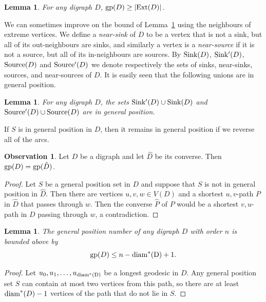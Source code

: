 \documentclass[a4paper,12pt]{article}
\newtheorem{lemma}[theorem]{Lemma}
\theoremstyle{definition}
\newtheorem{observation}[theorem]{Observation}
\newcommand{\sink }{{\rm Sink}}
\newcommand{\nsink }{{\rm Sink'}}
\newcommand{\source }{{\rm Source}}
\newcommand{\nsource }{{\rm Source'}}
\newcommand{\gp}{{\rm gp}}
\newcommand{\diam}{{\rm diam}}
\newcommand{\diamm}{\rm diam ^*}
\newcommand{\ext}{{\rm Ext}}
\begin{document}
	\begin{lemma}\label{lem:ext}
		For any digraph $D$, $\gp (D) \geq |\ext (D)|$.
	\end{lemma}
	
	We can sometimes improve on the bound of Lemma~\ref{lem:ext} using the neighbours of extreme vertices. We define a \emph{near-sink} of $D$ to be a vertex that is not a sink, but all of its out-neighbours are sinks, and similarly a vertex is a \emph{near-source} if it is not a source, but all of its in-neighbours are sources. By $\sink (D)$, $\nsink (D)$, $\source (D)$ and $\nsource (D)$ we denote respectively the sets of sinks, near-sinks, sources, and near-sources of $D$. It is easily seen that the following unions are in general position.
	
	\begin{lemma}\label{lem:sourcesandsinks}
		For any digraph $D$, the sets $\nsink (D) \cup \sink (D)$ and $\nsource (D) \cup \source (D)$ are in general position.
	\end{lemma}
	
	If $S$ is in general position in $D$, then it remains in general position if we reverse all of the arcs.
	
	\begin{observation}\label{obs 1}
		Let $D$ be a digraph and let $\hat{D}$ be its converse. Then $\gp(D) = \gp(\hat{D})$.
	\end{observation}
	\begin{proof}
		Let $S$ be a general position set in $D$ and suppose that $S$ is not in general position in $\hat{D}$. Then there are vertices $u,v,w \in V(D)$ and a shortest $u,v$-path $P$ in $\hat{D}$ that passes through $w$. Then the converse $\hat{P}$ of $P$ would be a shortest $v,u$-path in $D$ passing through $w$, a contradiction.
	\end{proof}
	
	
	
	\begin{lemma}\label{lem:diambound}
		The general position number of any digraph $D$ with order $n$ is bounded above by \[ \gp (D) \leq n-\diamm(D)+1.\]
	\end{lemma}
	\begin{proof}
		Let $u_0,u_1,\ldots ,u_{\diamm(D)}$ be a longest geodesic in $D$. Any general position set $S$ can contain at most two vertices from this path, so there are at least $\diam ^*(D)-1$ vertices of the path that do not lie in $S$.
	\end{proof}
	
\end{document}
